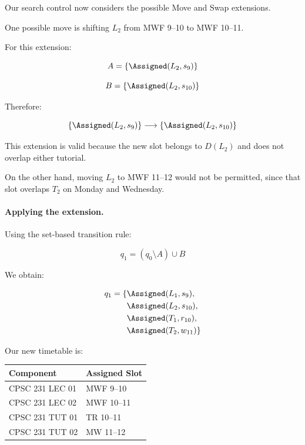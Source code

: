 Our search control now considers the possible Move and Swap extensions.

One possible move is shifting $L_2$ from MWF 9--10 to MWF 10--11.

For this extension:

\begin{equation}
    A=\{\Assigned(L_2,s_9)\}
\end{equation}

\begin{equation}
    B=\{\Assigned(L_2,s_{10})\}
\end{equation}

Therefore:

\begin{equation}
    \{\Assigned(L_2,s_9)\}
    \longrightarrow
    \{\Assigned(L_2,s_{10})\}
\end{equation}

This extension is valid because the new slot belongs to $D(L_2)$ and does not overlap either tutorial.

On the other hand, moving $L_2$ to MWF 11--12 would not be permitted, since that slot overlaps $T_2$ on Monday and Wednesday.

\paragraph{Applying the extension.}

Using the set-based transition rule:

\begin{equation}
    q_1=(q_0\setminus A)\cup B
\end{equation}

We obtain:

\begin{equation}
\begin{aligned}
q_1=\{&
\Assigned(L_1,s_9),\\
&
\Assigned(L_2,s_{10}),\\
&
\Assigned(T_1,r_{10}),\\
&
\Assigned(T_2,w_{11})
\}
\end{aligned}
\end{equation}

Our new timetable is:

\begin{center}
\begin{tabular}{ll}
\hline
Component & Assigned Slot\\
\hline
CPSC 231 LEC 01 & MWF 9--10\\
CPSC 231 LEC 02 & MWF 10--11\\
CPSC 231 TUT 01 & TR 10--11\\
CPSC 231 TUT 02 & MW 11--12\\
\hline
\end{tabular}
\end{center}

